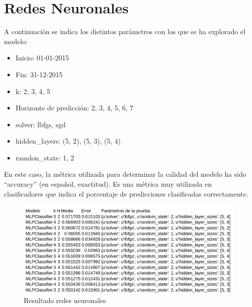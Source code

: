 


\section{Redes Neuronales}
\label{makereference7.3}

A continuación se indica los distintos parámetros con los que se ha explorado el modelo:

\begin{itemize}
\item Inicio: 01-01-2015
\item Fin: 31-12-2015
\item k: 2, 3, 4, 5
\item Horizonte de predicción: 2, 3, 4, 5, 6, 7
\item solver: lbfgs, sgd
\item hidden\_layers: (5, 2), (5, 3), (5, 4)
\item ramdon\_state: 1, 2
\end{itemize}

En este caso, la métrica utilizada para determinar la calidad del modelo ha sido ``accuracy'' (en español, exactitud). Es una métrica muy utilizada en clasificadores que indica el porcentaje de predicciones clasificadas correctamente.

\begin{figure}[htb]
	\begin{center}
		\includegraphics[width=17cm]{figures/resultado_mlp.png}
		\caption{Resultado redes neuronales \label{resultado_mlp}}
	\end{center}
\end{figure}

